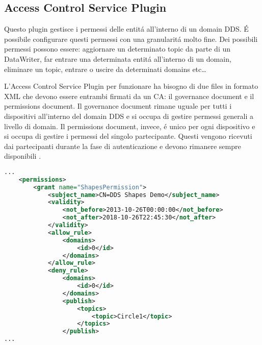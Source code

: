 \subsection{Access Control Service Plugin}

Questo plugin gestisce i permessi delle entitá all'interno di 
un domain DDS. É possibile configurare questi permessi con una 
granularitá molto fine. Dei possibili permessi possono essere:
aggiornare un determinato topic da parte di 
un DataWriter, far entrare una determinata entitá
all'interno di un domain, eliminare un topic, entrare o 
uscire da determinati domains etc\dots

L'Access Control Service Plugin per funzionare ha bisogno di due 
files in formato XML che devono essere entrambi firmati da 
un CA: il governance document e il permissions document.
Il governance document rimane uguale per tutti i dispositivi 
all'interno del domain DDS e si occupa di gestire 
permessi generali a livello di domain. Il permissions document,
invece, é unico per ogni dispositivo e si occupa di gestire i 
permessi del singolo partecipante.
Questi vengono ricevuti dai partecipanti durante la fase di
autenticazione e devono rimanere sempre disponibili \cite{essay93639}.



\vspace{5mm} %
\begin{lstlisting}[language=XML, caption=Estratto di permissions
    document{,} tratto da documento di riferimento 
    del DDS Security versione 1.1 \cite{ddssecurity1.1}.
    , label=XML permission file,
    captionpos=b]
...
    <permissions>
        <grant name="ShapesPermission">
            <subject_name>CN=DDS Shapes Demo</subject_name>
            <validity>
                <not_before>2013-10-26T00:00:00</not_before>
                <not_after>2018-10-26T22:45:30</not_after>
            </validity>
            <allow_rule>
                <domains>
                    <id>0</id>
                </domains>
            </allow_rule>
            <deny_rule>
                <domains>
                    <id>0</id>
                </domains>
                <publish>
                    <topics>
                        <topic>Circle1</topic>
                    </topics>
                </publish>
...
    \end{lstlisting}
\vspace{5mm}
\label{Access Control Service Plugin}

